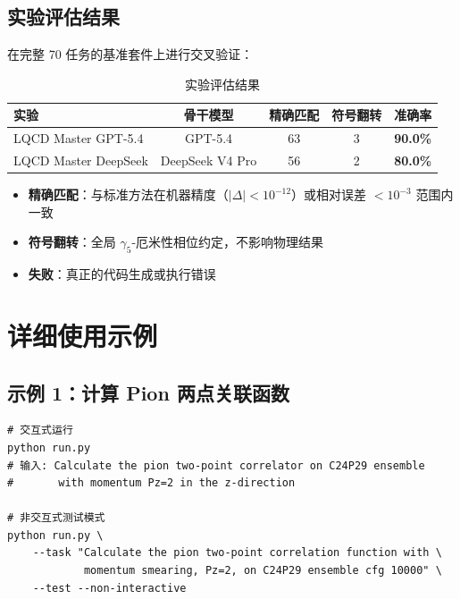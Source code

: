 \documentclass[12pt,a4paper]{ctexart}
\begin{document}
\subsection{实验评估结果}

在完整 70 任务的基准套件上进行交叉验证：

\begin{table}[h]
\centering
\begin{tabular}{@{}lcccc@{}}
\toprule
\textbf{实验} & \textbf{骨干模型} & \textbf{精确匹配} & \textbf{符号翻转} & \textbf{准确率} \\
\midrule
LQCD Master GPT-5.4   & GPT-5.4         & 63 & 3  & \textbf{90.0\%} \\
LQCD Master DeepSeek  & DeepSeek V4 Pro & 56 & 2  & \textbf{80.0\%} \\
\bottomrule
\end{tabular}
\caption{实验评估结果}
\end{table}

\begin{itemize}[itemsep=2pt]
    \item \textbf{精确匹配}：与标准方法在机器精度（$|\Delta| < 10^{-12}$）或相对误差 $< 10^{-3}$ 范围内一致
    \item \textbf{符号翻转}：全局 $\gamma_5$-厄米性相位约定，不影响物理结果
    \item \textbf{失败}：真正的代码生成或执行错误
\end{itemize}

\section{详细使用示例}

\subsection{示例 1：计算 Pion 两点关联函数}

\begin{lstlisting}[style=bashcode]
# 交互式运行
python run.py
# 输入: Calculate the pion two-point correlator on C24P29 ensemble
#       with momentum Pz=2 in the z-direction

# 非交互式测试模式
python run.py \
    --task "Calculate the pion two-point correlation function with \
            momentum smearing, Pz=2, on C24P29 ensemble cfg 10000" \
    --test --non-interactive
\end{lstlisting}
\end{document}
